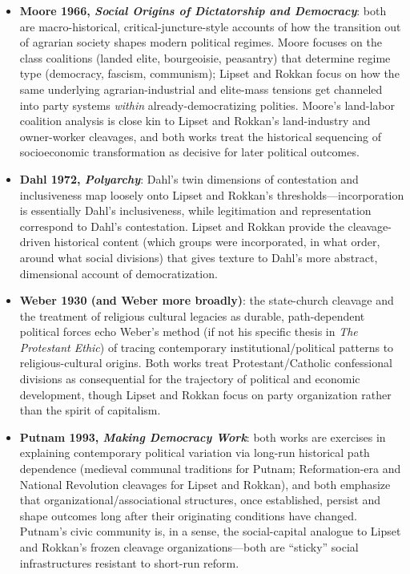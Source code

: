 \documentclass[12pt]{article}
\begin{document}
\begin{itemize}[leftmargin=*, itemsep=4pt]
    \item \textbf{Moore 1966, \textit{Social Origins of Dictatorship and Democracy}}: both are macro-historical, critical-juncture-style accounts of how the transition out of agrarian society shapes modern political regimes. Moore focuses on the class coalitions (landed elite, bourgeoisie, peasantry) that determine regime type (democracy, fascism, communism); Lipset and Rokkan focus on how the same underlying agrarian-industrial and elite-mass tensions get channeled into party systems \emph{within} already-democratizing polities. Moore's land-labor coalition analysis is close kin to Lipset and Rokkan's land-industry and owner-worker cleavages, and both works treat the historical sequencing of socioeconomic transformation as decisive for later political outcomes.
    \item \textbf{Dahl 1972, \textit{Polyarchy}}: Dahl's twin dimensions of contestation and inclusiveness map loosely onto Lipset and Rokkan's thresholds---incorporation is essentially Dahl's inclusiveness, while legitimation and representation correspond to Dahl's contestation. Lipset and Rokkan provide the cleavage-driven historical content (which groups were incorporated, in what order, around what social divisions) that gives texture to Dahl's more abstract, dimensional account of democratization.
    \item \textbf{Weber 1930 (and Weber more broadly)}: the state-church cleavage and the treatment of religious cultural legacies as durable, path-dependent political forces echo Weber's method (if not his specific thesis in \textit{The Protestant Ethic}) of tracing contemporary institutional/political patterns to religious-cultural origins. Both works treat Protestant/Catholic confessional divisions as consequential for the trajectory of political and economic development, though Lipset and Rokkan focus on party organization rather than the spirit of capitalism.
    \item \textbf{Putnam 1993, \textit{Making Democracy Work}}: both works are exercises in explaining contemporary political variation via long-run historical path dependence (medieval communal traditions for Putnam; Reformation-era and National Revolution cleavages for Lipset and Rokkan), and both emphasize that organizational/associational structures, once established, persist and shape outcomes long after their originating conditions have changed. Putnam's civic community is, in a sense, the social-capital analogue to Lipset and Rokkan's frozen cleavage organizations---both are ``sticky'' social infrastructures resistant to short-run reform.

\end{itemize}
\end{document}
